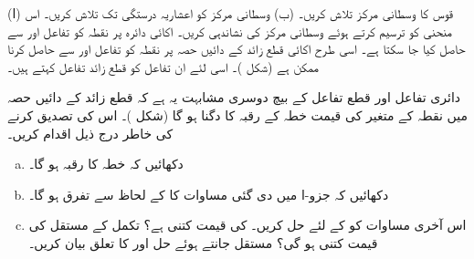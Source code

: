%
(ا) قوس  کا وسطانی مرکز تلاش کریں۔ (ب) وسطانی مرکز کو اعشاریہ درستگی تک تلاش کریں۔ اس منحنی کو ترسیم کرتے ہوئے وسطانی مرکز کی نشاندہی کریں۔ 
اکائی دائرہ پر نقطہ  کو تفاعل  اور سے حاصل کیا جا سکتا ہے۔ اسی طرح اکائی قطع زائد کے دائیں حصہ پر نقطہ  کو تفاعل  اور  سے حاصل کرنا ممکن ہے (شکل )۔ اسی لئے ان تفاعل کو قطع زائد تفاعل کہتے ہیں۔ 

دائری تفاعل اور قطع تفاعل کے بیچ دوسری مشابہت یہ ہے کہ قطع زائد  کے دائیں حصہ میں نقطہ  کے متغیر    کی قیمت خطہ  کے رقبہ کا دگنا ہو گا (شکل )۔ اس کی تصدیق کرنے کی خاطر درج ذیل اقدام کریں۔
\begin{enumerate}[a.]
\item
دکھائیں کہ خطہ  کا رقبہ  ہو گا۔
\item
دکھائیں کہ جزو-ا میں دی گئی مساوات کا  کے لحاظ سے تفرق  ہو گا۔
\item
اس آخری مساوات کو  کے لئے حل کریں۔  کی قیمت کتنی ہے؟ تکمل کے مستقل  کی قیمت کتنی ہو گی؟ مستقل  جانتے ہوئے حل  اور  کا تعلق بیان کریں۔
\end{enumerate}

